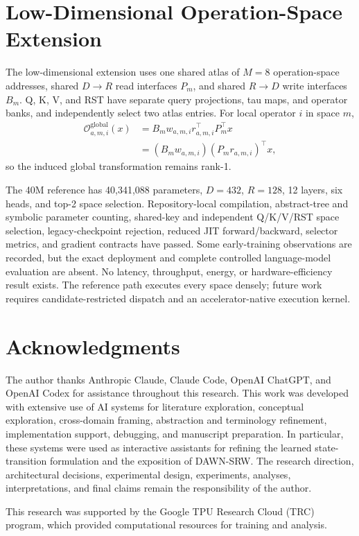 \documentclass{article}
\newcommand{\DAWN}{DAWN-SRW}
\newcommand{\op}{\mathcal{O}}
\begin{document}
\section{Low-Dimensional Operation-Space Extension}
\label{app:lowd}

The low-dimensional extension uses one shared atlas of \(M=8\) operation-space
addresses, shared \(D\!\to\!R\) read interfaces \(P_m\), and shared
\(R\!\to\!D\) write interfaces \(B_m\). Q, K, V, and RST have separate query
projections, tau maps, and operator banks, and independently select two atlas
entries. For local operator \(i\) in space \(m\),
\[
\begin{aligned}
\op^{\mathrm{global}}_{a,m,i}(x)
&=B_m w_{a,m,i}r_{a,m,i}^{\top}P_m^\top x\\
&=(B_mw_{a,m,i})(P_mr_{a,m,i})^\top x,
\end{aligned}
\]
so the induced global transformation remains rank-1.

The 40M reference has 40,341,088 parameters, \(D=432\), \(R=128\), 12
layers, six heads, and top-2 space selection. Repository-local compilation,
abstract-tree and symbolic parameter counting, shared-key and independent
Q/K/V/RST space selection, legacy-checkpoint rejection, reduced JIT
forward/backward, selector metrics, and gradient contracts have passed.
Some early-training observations are recorded, but the exact deployment and
complete controlled language-model evaluation are absent. No latency,
throughput, energy, or hardware-efficiency result exists. The reference path
executes every space densely; future work requires candidate-restricted
dispatch and an accelerator-native execution kernel.

\section*{Acknowledgments}

The author thanks Anthropic Claude, Claude Code, OpenAI ChatGPT, and OpenAI
Codex for assistance throughout this research. This work was developed with
extensive use of AI systems for literature exploration, conceptual exploration,
cross-domain framing, abstraction and terminology refinement, implementation
support, debugging, and manuscript preparation. In particular, these systems
were used as interactive assistants for refining the learned state-transition
formulation and the exposition of \DAWN{}. The research direction,
architectural decisions, experimental design, experiments, analyses,
interpretations, and final claims remain the responsibility of the author.

This research was supported by the Google TPU Research Cloud (TRC) program,
which provided computational resources for training and analysis.

\begingroup
\footnotesize
\setlength{\bibsep}{0pt}


\endgroup
\end{document}
